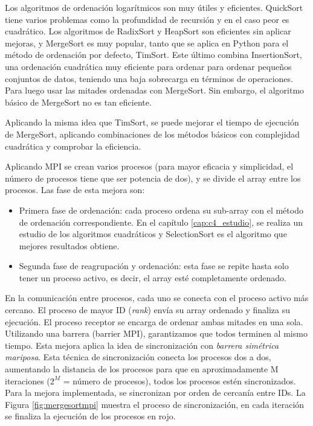 	Los algoritmos de ordenación logarítmicos son muy útiles y eficientes. QuickSort tiene varios problemas como la profundidad de recursión y en el caso peor es cuadrático. Los algoritmos de RadixSort y HeapSort son eficientes sin aplicar mejoras, y MergeSort es muy popular, tanto que se aplica en Python para el método de ordenación por defecto, TimSort\cite{auger2015merge}. Este último combina InsertionSort, una ordenación cuadrática muy eficiente para ordenar para ordenar pequeños conjuntos de datos, teniendo una baja sobrecarga en términos de operaciones. Para luego usar las mitades ordenadas con MergeSort. Sin embargo, el algoritmo básico de MergeSort no es tan eficiente.
	
	Aplicando la misma idea que TimSort, se puede mejorar el tiempo de ejecución de MergeSort, aplicando combinaciones de los métodos básicos con complejidad cuadrática y comprobar la eficiencia.
	
	
	Aplicando MPI se crean varios procesos (para mayor eficacia y simplicidad, el número de procesos tiene que ser potencia de dos), y se divide el array entre los procesos. Las fase de esta mejora son:
	\begin{itemize}
		\item Primera fase de ordenación: cada proceso ordena su sub-array con el método de ordenación correspondiente. En el capítulo \ref{cap:c4_estudio}, se realiza un estudio de los algoritmos cuadráticos y SelectionSort es el algoritmo que mejores resultados obtiene.
		\item Segunda fase de reagrupación y ordenación: esta fase se repite hasta solo tener un proceso activo, es decir, el array esté completamente ordenado.
	\end{itemize}
	
	En la comunicación entre procesos, cada uno se conecta con el proceso activo más cercano. El proceso de mayor ID (\textit{rank}) envía su array ordenado y finaliza su ejecución. El proceso receptor se encarga de ordenar ambas mitades en una sola. Utilizando una barrera (barrier MPI), garantizamos que todos terminen al mismo tiempo. Esta mejora aplica la idea de sincronización con \textit{barrera simétrica mariposa}. Esta técnica de sincronización conecta los procesos dos a dos, aumentando la distancia de los procesos para que en aproximadamente M iteraciones (\(2^{M}\) = número de procesos), todos los procesos estén sincronizados. Para la mejora implementada, se sincronizan por orden de cercanía entre IDs. La Figura \ref{fig:mergesortmpi} muestra el proceso de sincronización, en cada iteración se finaliza la ejecución de los procesos en rojo.  
	
